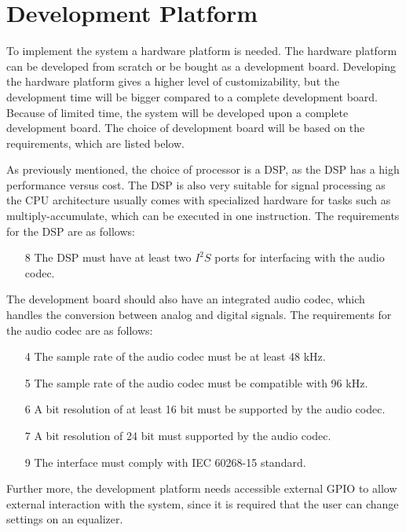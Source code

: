 \chapter{Development Platform}

To implement the system a hardware platform is needed. The hardware platform can be developed from scratch or be bought as a development board. Developing the hardware platform gives a higher level of customizability, but the development time will be bigger compared to a complete development board. Because of limited time, the system will be developed upon a complete development board. The choice of development board will be based on the requirements, which are listed below.

As previously mentioned, the choice of processor is a DSP, as the DSP has a high performance versus cost. The DSP is also very suitable for signal processing as the CPU architecture usually comes with specialized hardware for tasks such as multiply-accumulate, which can be executed in one instruction. The requirements for the DSP are as follows:

\begin{enumerate}
\item[8] The DSP must have at least two $I^2S$ ports for interfacing with the audio codec.
\end{enumerate}

The development board should also have an integrated audio codec, which handles the conversion between analog and digital signals. The requirements for the audio codec are as follows:

\begin{enumerate}
\item[4] The sample rate of the audio codec must be at least 48 kHz.\\
\item[5] The sample rate of the audio codec must be compatible with 96 kHz.\\
\item[6] A bit resolution of at least 16 bit must be supported by the audio codec. \\
\item[7] A bit resolution of 24 bit must supported by the audio codec.\\
\item[9] The interface must comply with IEC 60268-15 standard.
\end{enumerate}

Further more, the development platform needs accessible external GPIO to allow external interaction with the system, since it is required that the user can change settings on an equalizer. 


